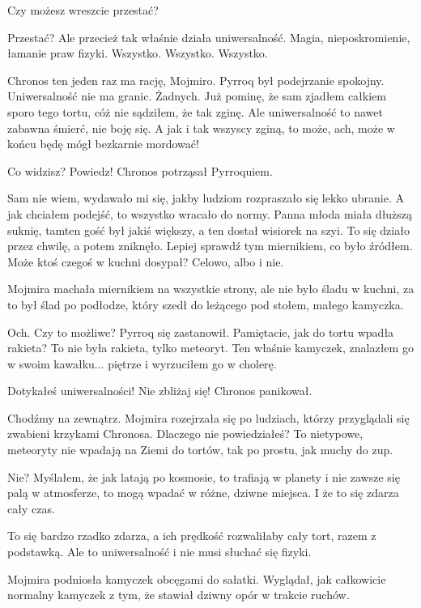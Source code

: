 \ds{} Czy możesz wreszcie przestać? \de{}

\ds{} Przestać? Ale przecież tak właśnie działa uniwersalność. Magia, nieposkromienie, łamanie praw fizyki. Wszystko. Wszystko. Wszystko. \de{}

\ds{} Chronos ten jeden raz ma rację, Mojmiro. \dm{} Pyrroq był podejrzanie spokojny. \dm{} Uniwersalność nie ma granic. Żadnych. 
Już pominę, że sam zjadłem całkiem sporo tego tortu, cóż nie sądziłem, że tak zginę. Ale uniwersalność to nawet zabawna śmierć, nie boję się. 
A jak i tak wszyscy zginą, to może, ach, może w końcu będę mógł bezkarnie mordować! \de{}

\ds{} Co widzisz? Powiedz! \dm{} Chronos potrząsał Pyrroquiem. \de{}

\ds{} Sam nie wiem, wydawało mi się, jakby ludziom rozpraszało się lekko ubranie. A jak chciałem podejść, to wszystko wracało do normy.
Panna młoda miała dłuższą suknię, tamten gość był jakiś większy, a ten dostał wisiorek na szyi. To się działo przez chwilę, a potem zniknęło.
Lepiej sprawdź tym miernikiem, co było źródłem. Może ktoś czegoś w kuchni dosypał? Celowo, albo i nie. \de{}

Mojmira machała miernikiem na wszystkie strony, ale nie było śladu w kuchni, za to był ślad po podłodze, który szedł do leżącego pod stołem, małego kamyczka.

\ds{} Och. Czy to możliwe? \dm{} Pyrroq się zastanowił. \dm{} Pamiętacie, jak do tortu wpadła rakieta? To nie była rakieta, tylko meteoryt. 
Ten właśnie kamyczek, znalazłem go w swoim kawałku... piętrze i wyrzuciłem go w cholerę. \de{}

\ds{} Dotykałeś uniwersalności! Nie zbliżaj się! \dm{} Chronos panikował. \de{}

\ds{} Chodźmy na zewnątrz. \dm{} Mojmira rozejrzała się po ludziach, którzy przyglądali się zwabieni krzykami Chronosa. \dm{} 
Dlaczego nie powiedziałeś? To nietypowe, meteoryty nie wpadają na Ziemi do tortów, tak po prostu, jak muchy do zup. \de{}

\ds{} Nie? Myślałem, że jak latają po kosmosie, to trafiają w planety i nie zawsze się palą w atmosferze, to mogą wpadać w różne, dziwne miejsca. 
I że to się zdarza cały czas. \de{}

\ds{} To się bardzo rzadko zdarza, a ich prędkość rozwaliłaby cały tort, razem z podstawką. Ale to uniwersalność i nie musi słuchać się fizyki. 

Mojmira podniosła kamyczek obcęgami do sałatki. 
Wyglądał, jak całkowicie normalny kamyczek z tym, że stawiał dziwny opór w trakcie ruchów.

